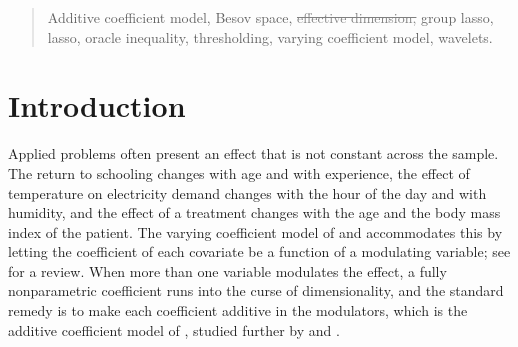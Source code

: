 \documentclass[12pt]{article} %
\renewcommand{\theequation}{\thesection\arabic{equation}}
\theoremstyle{definition}
\theoremstyle{plain}
\begin{document}
\begin{quotation}
\vspace{9pt}
Additive coefficient model, Besov space, \textcolor{gray}{\sout{effective dimension,}} \textcolor{colR1}{group
lasso,} lasso, oracle
inequality, \textcolor{colR1}{thresholding,} varying coefficient model, wavelets.
\par
\end{quotation}\par

\def\thefigure{\arabic{figure}}
\def\thetable{\arabic{table}}

\renewcommand{\theequation}{\thesection.\arabic{equation}}

\fontsize{12}{14pt plus.8pt minus .6pt}\selectfont

\section{Introduction}
\label{sec:intro}

Applied problems often present an effect that is not constant across the
sample. The return to schooling changes with age and with experience, the
effect of temperature on electricity demand changes with the hour of the day
and with humidity, and the effect of a treatment changes with the age and the
body mass index of the patient. The varying coefficient model of
\citet{Hastie-Tibshirani-1993} and \citet*{Cai-Fan-Yao-2000} accommodates this
by letting the coefficient of each covariate be a function of a modulating
variable; see \citet{Fan-Zhang-2008} for a review. When more than one variable
modulates the effect, a fully nonparametric coefficient runs into the curse of
dimensionality, and the standard remedy is to make each coefficient additive
in the modulators, which is the additive coefficient model of
\citet{Xue-Yang-2006}, studied further by \citet{Xue-Liang-2010} and
\citet{Liu-Yang-2010}.
\end{document}
